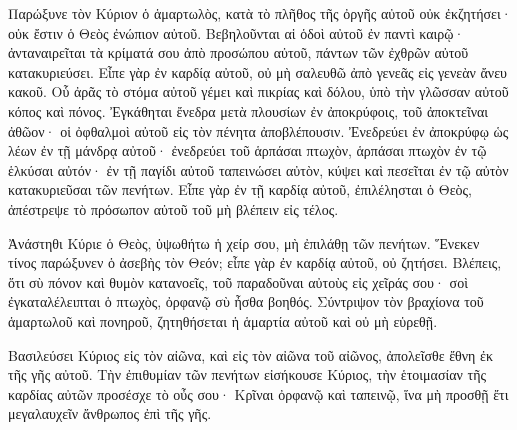 {Παρώξυνε τὸν Κύριον ὁ ἁμαρτωλὸς, κατὰ τὸ πλῆθος τῆς ὀργῆς αὐτοῦ οὐκ ἐκζητήσει· οὐκ ἔστιν ὁ Θεὸς ἐνώπιον αὐτοῦ.
Βεβηλοῦνται αἱ ὁδοὶ αὐτοῦ ἐν παντὶ καιρῷ· ἀνταναιρεῖται τὰ κρίματά σου ἀπὸ προσώπου αὐτοῦ, πάντων τῶν ἐχθρῶν αὐτοῦ κατακυριεύσει.
Εἶπε γὰρ ἐν καρδίᾳ αὐτοῦ, οὐ μὴ σαλευθῶ ἀπὸ γενεᾶς εἰς γενεὰν ἄνευ κακοῦ.
Οὗ ἀρᾶς τὸ στόμα αὐτοῦ γέμει καὶ πικρίας καὶ δόλου, ὑπὸ τὴν γλῶσσαν αὐτοῦ κόπος καὶ πόνος.
Ἐγκάθηται ἔνεδρα μετὰ πλουσίων ἐν ἀποκρύφοις, τοῦ ἀποκτεῖναι ἀθῶον· οἱ ὀφθαλμοὶ αὐτοῦ εἰς τὸν πένητα ἀποβλέπουσιν.
Ἐνεδρεύει ἐν ἀποκρύφῳ ὡς λέων ἐν τῇ μάνδρᾳ αὐτοῦ· ἐνεδρεύει τοῦ ἁρπάσαι πτωχὸν, ἁρπάσαι πτωχὸν ἐν τῷ ἑλκύσαι αὐτόν· ἐν τῇ παγίδι αὐτοῦ
ταπεινώσει αὐτὸν, κύψει καὶ πεσεῖται ἐν τῷ αὐτὸν κατακυριεῦσαι τῶν πενήτων.
Εἶπε γὰρ ἐν τῇ καρδίᾳ αὐτοῦ, ἐπιλέλησται ὁ Θεὸς, ἀπέστρεψε τὸ πρόσωπον αὐτοῦ τοῦ μὴ βλέπειν εἰς τέλος.
\par }{\PP {}Ἀνάστηθι Κύριε ὁ Θεὸς, ὑψωθήτω ἡ χείρ σου, μὴ ἐπιλάθῃ τῶν πενήτων.
Ἕνεκεν τίνος παρώξυνεν ὁ ἀσεβὴς τὸν Θεόν; εἶπε γὰρ ἐν καρδίᾳ αὐτοῦ, οὐ ζητήσει.
Βλέπεις, ὅτι σὺ πόνον καὶ θυμὸν κατανοεῖς, τοῦ παραδοῦναι αὐτοὺς εἰς χεῖράς σου· σοὶ ἐγκαταλέλειπται ὁ πτωχὸς, ὀρφανῷ σὺ ἦσθα βοηθός.
Σύντριψον τὸν βραχίονα τοῦ ἁμαρτωλοῦ καὶ πονηροῦ, ζητηθήσεται ἡ ἁμαρτία αὐτοῦ καὶ οὐ μὴ εὑρεθῇ.
\par }{\PP {}Βασιλεύσει Κύριος εἰς τὸν αἰῶνα, καὶ εἰς τὸν αἰῶνα τοῦ αἰῶνος, ἀπολεῖσθε ἔθνη ἐκ τῆς γῆς αὐτοῦ.
Τὴν ἐπιθυμίαν τῶν πενήτων εἰσήκουσε Κύριος, τὴν ἑτοιμασίαν τῆς καρδίας αὐτῶν προσέσχε τὸ οὖς σου·
Κρῖναι ὀρφανῷ καὶ ταπεινῷ, ἵνα μὴ προσθῇ ἔτι μεγαλαυχεῖν ἄνθρωπος ἐπὶ τῆς γῆς.

\par }
